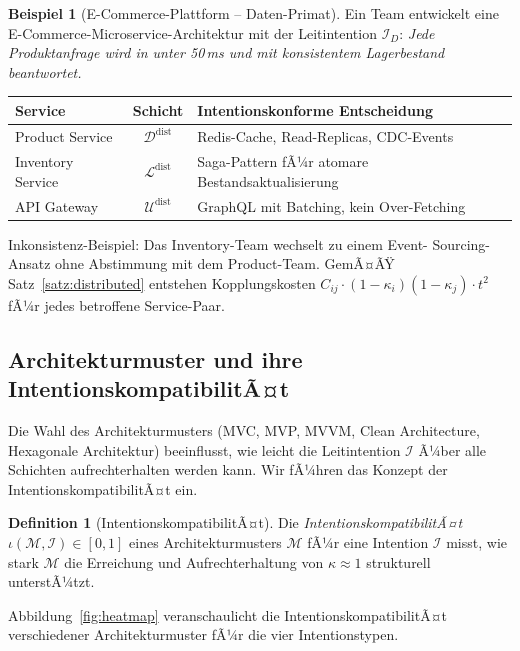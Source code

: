 ﻿\documentclass[a4paper,12pt]{article}
\theoremstyle{definition}
\newtheorem{definition}{Definition}
\newtheorem{beispiel}{Beispiel}
\begin{document}
\begin{beispiel}[E-Commerce-Plattform -- Daten-Primat]\label{bsp:ecommerce}
Ein Team entwickelt eine E-Commerce-Microservice-Architektur mit der
Leitintention $\mathcal{I}_D$: \textit{\glqq{}Jede Produktanfrage wird in
unter 50\,ms und mit konsistentem Lagerbestand beantwortet.\grqq{}}

\begin{center}
\begin{tabular}{lcp{5cm}}
\toprule
Service & Schicht & Intentionskonforme Entscheidung \\
\midrule
Product Service & $\mathcal{D}^{\text{dist}}$ & Redis-Cache, Read-Replicas,
CDC-Events \\
Inventory Service & $\mathcal{L}^{\text{dist}}$ & Saga-Pattern fÃ¼r
atomare Bestandsaktualisierung \\
API Gateway & $\mathcal{U}^{\text{dist}}$ & GraphQL mit Batching,
kein Over-Fetching \\
\bottomrule
\end{tabular}
\end{center}

Inkonsistenz-Beispiel: Das Inventory-Team wechselt zu einem Event-
Sourcing-Ansatz ohne Abstimmung mit dem Product-Team. GemÃ¤ÃŸ
Satz~\ref{satz:distributed} entstehen Kopplungskosten $C_{ij} \cdot
(1-\kappa_i)(1-\kappa_j) \cdot t^2$ fÃ¼r jedes betroffene Service-Paar.
\end{beispiel}

\subsection{Architekturmuster und ihre IntentionskompatibilitÃ¤t}

Die Wahl des Architekturmusters (MVC, MVP, MVVM, Clean Architecture,
Hexagonale Architektur) beeinflusst, wie leicht die Leitintention
$\mathcal{I}$ Ã¼ber alle Schichten aufrechterhalten werden kann. Wir
fÃ¼hren das Konzept der IntentionskompatibilitÃ¤t ein.

\begin{definition}[IntentionskompatibilitÃ¤t]
Die \emph{IntentionskompatibilitÃ¤t} $\iota(\mathcal{M}, \mathcal{I}) \in [0,1]$
eines Architekturmusters $\mathcal{M}$ fÃ¼r eine Intention $\mathcal{I}$
misst, wie stark $\mathcal{M}$ die Erreichung und Aufrechterhaltung von
$\kappa \approx 1$ strukturell unterstÃ¼tzt.
\end{definition}

Abbildung~\ref{fig:heatmap} veranschaulicht die IntentionskompatibilitÃ¤t
verschiedener Architekturmuster fÃ¼r die vier Intentionstypen.
\end{document}
